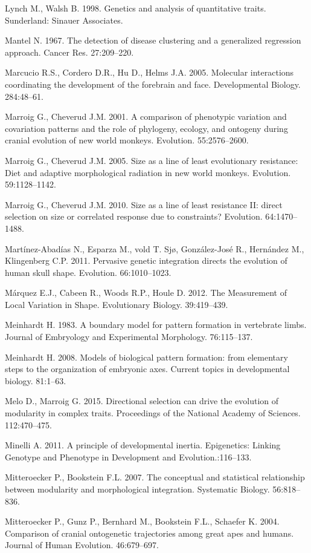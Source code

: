 \documentclass[12pt,]{article}
\begin{document}
Lynch M., Walsh B. 1998. Genetics and analysis of quantitative traits.
Sunderland: Sinauer Associates.

Mantel N. 1967. The detection of disease clustering and a generalized
regression approach. Cancer Res. 27:209--220.

Marcucio R.S., Cordero D.R., Hu D., Helms J.A. 2005. Molecular
interactions coordinating the development of the forebrain and face.
Developmental Biology. 284:48--61.

Marroig G., Cheverud J.M. 2001. A comparison of phenotypic variation and
covariation patterns and the role of phylogeny, ecology, and ontogeny
during cranial evolution of new world monkeys. Evolution. 55:2576--2600.

Marroig G., Cheverud J.M. 2005. Size as a line of least evolutionary
resistance: Diet and adaptive morphological radiation in new world
monkeys. Evolution. 59:1128--1142.

Marroig G., Cheverud J.M. 2010. Size as a line of least resistance II:
direct selection on size or correlated response due to constraints?
Evolution. 64:1470--1488.

Martínez-Abadías N., Esparza M., vold T. Sjø, González-José R.,
Hernández M., Klingenberg C.P. 2011. Pervasive genetic integration
directs the evolution of human skull shape. Evolution. 66:1010--1023.

Márquez E.J., Cabeen R., Woods R.P., Houle D. 2012. The Measurement of
Local Variation in Shape. Evolutionary Biology. 39:419--439.

Meinhardt H. 1983. A boundary model for pattern formation in vertebrate
limbs. Journal of Embryology and Experimental Morphology. 76:115--137.

Meinhardt H. 2008. Models of biological pattern formation: from
elementary steps to the organization of embryonic axes. Current topics
in developmental biology. 81:1--63.

Melo D., Marroig G. 2015. Directional selection can drive the evolution
of modularity in complex traits. Proceedings of the National Academy of
Sciences. 112:470--475.

Minelli A. 2011. A principle of developmental inertia. Epigenetics:
Linking Genotype and Phenotype in Development and Evolution.:116--133.

Mitteroecker P., Bookstein F.L. 2007. The conceptual and statistical
relationship between modularity and morphological integration.
Systematic Biology. 56:818--836.

Mitteroecker P., Gunz P., Bernhard M., Bookstein F.L., Schaefer K. 2004.
Comparison of cranial ontogenetic trajectories among great apes and
humans. Journal of Human Evolution. 46:679--697.
\end{document}
